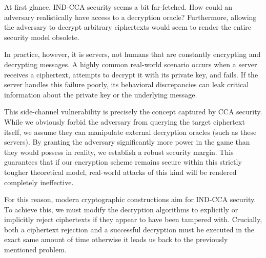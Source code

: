 
At first glance, IND-CCA security seems a bit far-fetched. How could an adversary realistically have access to a decryption oracle? Furthermore, allowing the adversary to decrypt arbitrary ciphertexts would seem to render the entire security model obsolete. 

In practice, however, it is servers, not humans that are constantly encrypting and decrypting messages. A highly common real-world scenario occurs when a server receives a ciphertext, attempts to decrypt it with its private key, and fails. If the server handles this failure poorly, its behavioral discrepancies can leak critical information about the private key or the underlying message. 

This side-channel vulnerability is precisely the concept captured by CCA security. While we obviously forbid the adversary from querying the target ciphertext itself, we assume they can manipulate external decryption oracles (such as these servers). By granting the adversary significantly more power in the game than they would possess in reality, we establish a robust security margin. This guarantees that if our encryption scheme remains secure within this strictly tougher theoretical model, real-world attacks of this kind will be rendered completely ineffective.

For this reason, modern cryptographic constructions aim for IND-CCA security. To achieve this, we must modify the decryption algorithms to explicitly or implicitly reject ciphertexts if they appear to have been tampered with. Crucially, both a ciphertext rejection and a successful decryption must be executed in the exact same amount of time otherwise it leads us back to the previously mentioned problem.









